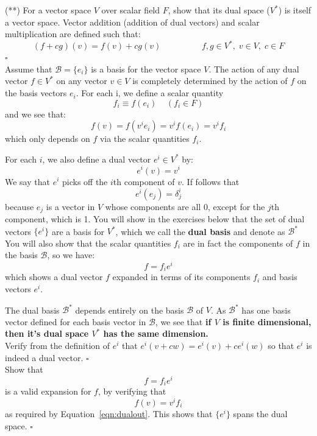 \documentclass[12pt]{article}
\begin{document}
\exercise (**)
For a vector space $V$ over scalar field $F$, show that its dual space
($V^*$) is itself a vector space.  Vector addition (addition of dual
vectors) and scalar multiplication are defined such that:
$$(f+cg)(v) = f(v) + c g(v) \hspace{2cm} f,g \in V^*,\; v \in V,\; c \in F $$
 $\square$ \\[3pt]

\noindent
Assume that $\mathcal{B} = \{ e_i\}$ is a basis for the vector space $V$.
The action of any dual vector $f \in V^*$ on any vector $v \in V$ is completely determined by
the action of $f$ on the basis vectors $e_i$.  For each i, we define a scalar quantity
$$f_i \equiv f(e_i)~~~~~(f_i \in F)$$
and we see that:
\begin{equation}
\label{eqn:dualout}
f(v) = f (v^i e_i) = v^i f(e_i) = v^i f_i
\end{equation}
which only depends on $f$ via the scalar quantities $f_i$.

For each $i$, we also define a dual vector $e^i \in V^*$ by:
$$e^i(v) = v^i$$
We say that $e^i$ picks off the $i$th component of $v$.
If follows that
$$e^i(e_j) = \delta^i_j$$
because $e_j$ is a vector in $V$ whose components are all 0, except for the $j$th component, which is 1.  You will show in the exercises below that the set of dual vectors $\{e^i\}$ are a basis for $V^*$, which we call the {\bf dual basis} and denote as $\mathcal{B}^*$
You will also show that the scalar quantities $f_i$ are in fact the components of $f$ in the basis $\mathcal{B}$, so we have:
$$f = f_i e^i$$
which shows a dual vector $f$ expanded in terms of its components $f_i$ and basis vectors $e^i$.

The dual basis $\mathcal{B}^*$ depends entirely on the basis $\mathcal{B}$ of
$V$.  As $\mathcal{B}^*$ has one basis vector defined for each basis vector in
$\mathcal{B}$, we see that {\bf if $V$ is finite dimensional, then it's
dual space $V^*$ has the same dimension.}\\[3pt]

\exercise 
Verify from the definition of $e^i$ that  $e^i(v + c w) = e^i(v) + c e^i(w)$ so that $e^i$ is indeed a dual vector. $\square$ \\[3pt]

\exercise Show that
$$f = f_i e^i$$
is a valid expansion for $f$, by verifying that
$$f(v) = v^i f_i$$
as required by Equation~\ref{eqn:dualout}. This shows that $\{e^i\}$ spans the dual space. $\square$ \\[3pt]
\end{document}
